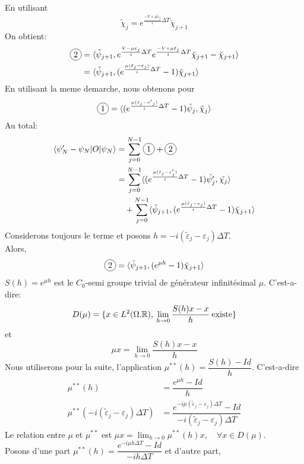 En utilisant
\begin{equation}
\tilde{\chi}_j = e^{\frac{-V+\mu\tilde{\varepsilon}_j}{i}\Delta T}  \breve{\chi}_{j+1}
\end{equation}
On obtient:
\begin{align*}
\circled{2} 
&= \langle \tilde{\psi}_{j+1}, e^{\frac{V-\mu\varepsilon_j}{i}\Delta T} e^{\frac{-V+\mu\tilde{\varepsilon}_j}{i}\Delta T}  \breve{\chi}_{j+1} - \breve{\chi}_{j+1} \rangle\\
&= \langle \tilde{\psi}_{j+1}, (e^{\frac{\mu (\tilde{\varepsilon}_j-\varepsilon_j)}{i}\Delta T} -1) \breve{\chi}_{j+1} \rangle
\end{align*}
En utilisant la meme demarche, nous obtenons pour 
$$
\circled{1} = \langle (e^{\frac{\mu (\tilde{\varepsilon}_j-{\varepsilon'}_j)}{i}\Delta T} -1) \breve{\psi}_{j},  \tilde{\chi}_{j} \rangle
$$
Au total:
\begin{align*}
\langle \psi'_N-\psi_N |O|\psi_N \rangle 
&=\sum_{j=0}^{N-1} \circled{1}+\circled{2}\\
&= \sum_{j=0}^{N-1} \langle (e^{\frac{\mu(\tilde{\varepsilon}_j-\varepsilon'_j)}{i}\Delta T}-1)\breve{\psi'_j} , \tilde{\chi_j} \rangle\\
&\quad +\sum_{j=0}^{N-1} \langle \tilde{\psi}_{j+1},  (e^{\frac{\mu(\tilde{\varepsilon}_j-\varepsilon_j)}{i}\Delta T}-1)\breve{\chi}_{j+1} \rangle
\end{align*}
Considerons toujours le terme  et posons $h=-i(\tilde{\varepsilon}_j-\varepsilon_j)\Delta T$.\\
Alors,
$$
\circled{2}=\langle \tilde{\psi}_{j+1},(e^{\mu h}-1)\breve{\chi}_{j+1} \rangle
$$
$S(h)=e^{\mu h}$ est le $C_0$-semi groupe trivial de générateur infinitésimal $\mu$. C'est-a-dire:
$$
D(\mu)=\{x\in L^2(\Omega. \mathbb R), \: \lim_{h \rightarrow 0} \dfrac{S(h)x-x}{h} \: \mbox{existe}\}
$$
et
$$
\mu x = \lim_{h \rightarrow 0} \dfrac{S(h)x-x}{h}
$$
Nous utiliserons pour la suite, l'application $\mu^{**}(h)= \dfrac{S(h)-Id}{h}$. C'est-a-dire
\begin{align*}
\mu^{**}(h) &= \dfrac{e^{\mu h}-Id}{h}\\
\mu^{**}(-i(\tilde{\varepsilon}_j-\varepsilon_j)\Delta T) &= \dfrac{e^{-i\mu (\tilde{\varepsilon}_j-\varepsilon_j)\Delta T}-Id}{-i(\tilde{\varepsilon}_j-\varepsilon_j)\Delta T}
\end{align*}
Le relation entre $\mu$ et $\mu^{**}$ est $\mu x = \lim_{h \rightarrow 0} \mu^{**}(h)x, \quad \forall x \in D(\mu)$.\\
Posons d'une part $\mu^{**}(h)=\dfrac{e^{-i\mu h\Delta T}-Id}{-ih\Delta T}$ et d'autre part,

